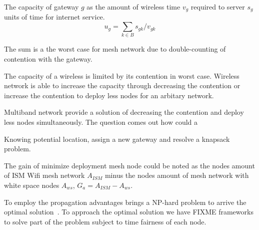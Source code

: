 The capacity of gateway $g$ as the amount of wireless time $v_g$ required to server $s_g$ units of time for internet service.
\begin{equation}
u_{g}=\sum_{k\in B} s_{gk}/v_{gk}
\end{equation}

The sum is a the worst case for mesh network due to double-counting of contention with the gateway.

The capacity of a wireless is limited by its contention in worst case. 
Wireless network is able to increase the capacity through decreasing the contention or increase the contention to deploy less nodes for an arbitary network. 

Multiband network provide a solution of decreasing the contention and deploy less nodes simultaneously. 
The question comes out how could a 

Knowing potential location, assign a new gateway and resolve a knapsack problem.



The gain of minimize deployment mesh node could be noted as the nodes amount of ISM Wifi mesh network $A_{ISM}$ minus the nodes amount of mesh network with white space nodes $A_{ws}$, $G_a=A_{ISM}-A_{ws}$.


To employ the propagation advantages brings a NP-hard problem to arrive the optimal solution~\cite{arkoulis2013optimal}. 
To approach the optimal solution we have FIXME frameworks to solve part of the problem subject to time fairness of each node.




